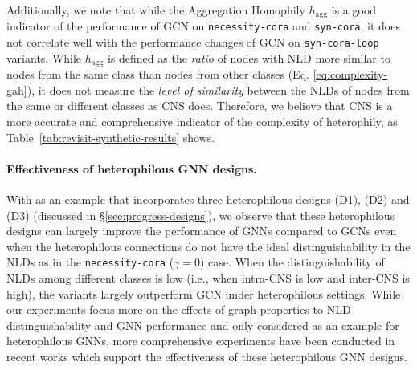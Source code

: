 Additionally, we note that while the Aggregation Homophily $h_{\mathrm{agg}}$ is a good indicator of the performance of GCN on \texttt{necessity-cora} and \texttt{syn-cora}, it does not correlate well with the performance changes of GCN on \texttt{syn-cora-loop} variants. 
While $h_{\mathrm{agg}}$ is defined as the \emph{ratio} of nodes with NLD more similar %
to nodes from the same class than nodes from other classes (Eq. \eqref{eq:complexity-gah}), it does not measure the \emph{level of similarity} between the NLDs of nodes from the same or different classes as CNS does. Therefore, we believe that CNS is a more accurate and comprehensive indicator of the complexity of heterophily, as Table~\ref{tab:revisit-synthetic-results} shows. 

\paragraph{Effectiveness of heterophilous GNN designs.} 
With \method as an example that incorporates three heterophilous designs (D1), (D2) and (D3) (discussed in \S\ref{sec:progress-designs}),
we observe that these heterophilous designs can largely improve the performance of GNNs compared to GCNs even when the heterophilous connections do not have the ideal distinguishability in the NLDs as in the \texttt{necessity-cora} ($\gamma=0$) case.
When the distinguishability of NLDs among different classes is low (i.e., when intra-CNS is low and inter-CNS is high), the \method variants largely outperform GCN under heterophilous settings. 
While our experiments focus more on the effects of graph properties to NLD distinguishability and GNN performance and only considered \method as an example for heterophilous GNNs, more comprehensive experiments have been conducted in recent works \cite{platonov2023critical,yan2022two,lim2021large} which support the effectiveness of these heterophilous GNN designs. 

